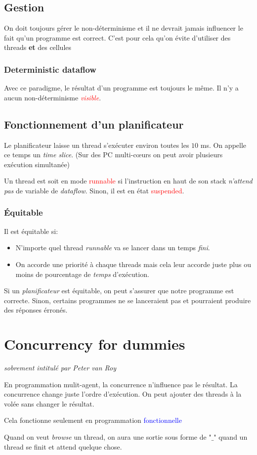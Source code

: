 \documentclass{report}
\begin{document}
\subsection{Gestion}
On doit toujours gérer le non-déterminisme et il ne devrait jamais influencer le fait qu'un programme est correct. C'est pour cela qu'on évite d'utiliser des threads \textbf{et} des cellules

\subsubsection{Deterministic dataflow}
Avec ce paradigme, le résultat d'un programme est toujours le même. Il n'y a aucun non-déterminisme \textcolor{red}{\textit{visible}}.

\subsection{Fonctionnement d'un planificateur}
Le planificateur laisse un thread s'exécuter environ toutes les $10$ ms. On appelle ce temps un \textit{time slice}. (Sur des PC multi-cœurs on peut avoir plusieurs exécution simultanée)\par
Un thread est soit en mode \textcolor{red}{runnable} si l'instruction en haut de son stack \textit{n'attend pas} de variable de \textit{dataflow}. Sinon, il est en état \textcolor{red}{suspended}.

\subsubsection{Équitable}
Il est équitable si:
\begin{itemize}
\item N'importe quel thread \textit{runnable} va se lancer dans un temps \textit{fini}.
\item On accorde une priorité à chaque threads mais cela leur accorde juste plus ou moins de pourcentage de \textit{temps} d'exécution.
\end{itemize}
Si un \textit{planificateur} est équitable, on peut s'assurer que notre programme est correcte. Sinon, certains programmes ne se lanceraient pas et pourraient produire des réponses érronés.

\section{Concurrency for dummies}
\noindent
\textit{sobrement intitulé par Peter van Roy}\par
En programmation mulit-agent, la concurrence n'influence pas le résultat. La concurrence change juste l'ordre d'exécution. On peut ajouter des threads à la volée sans changer le résultat.\par
Cela fonctionne seulement en programmation \textcolor{blue}{fonctionnelle}\par
Quand on veut \textit{browse} un thread, on aura une sortie sous forme de "$\_$" quand un thread se finit et attend quelque chose.
\end{document}
